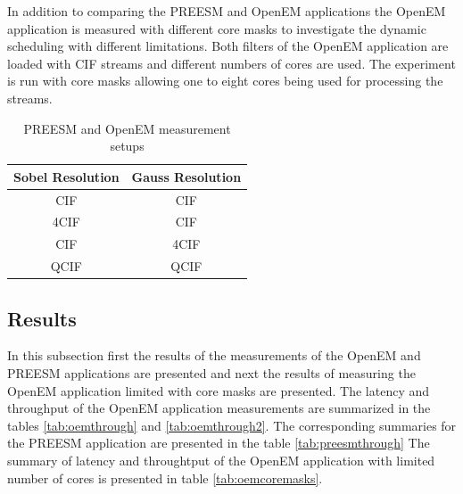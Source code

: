 In addition to comparing the PREESM and OpenEM applications the OpenEM application is measured with different core masks to investigate the dynamic scheduling with different limitations. Both filters of the OpenEM application are loaded with CIF streams and different numbers of cores are used. The experiment is run with core masks allowing one to eight cores being used for processing the streams.


\begin{table}
    \begin{center}
        \begin{tabular}{ c c }
            Sobel Resolution & Gauss Resolution \\ \hline
            CIF              & CIF              \\ \hline
            4CIF             & CIF              \\ \hline
            CIF              & 4CIF             \\ \hline
            QCIF             & QCIF             \\ \hline
        \end{tabular}
        \caption{PREESM and OpenEM measurement setups}
        \label{tab:preesm_setups}
    \end{center}
\end{table}

\subsection{Results}

In this subsection first the results of the measurements of the OpenEM and PREESM applications are presented and next the results of measuring the OpenEM application limited with core masks are presented. The latency and throughput of the OpenEM application measurements are summarized in the tables \ref{tab:oemthrough} and \ref{tab:oemthrough2}. The corresponding summaries for the PREESM application are presented in the table \ref{tab:preesmthrough} The summary of latency and throughtput of the OpenEM application with limited number of cores is presented in table \ref{tab:oemcoremasks}.

